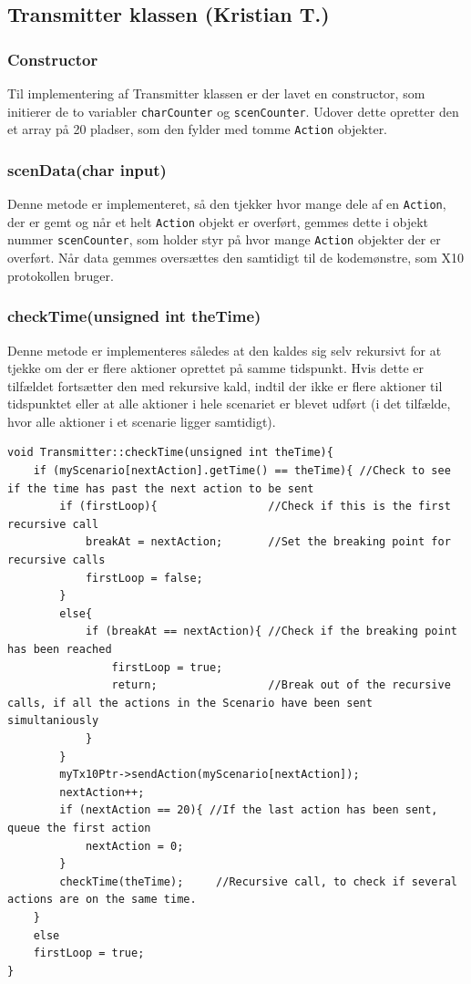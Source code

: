 \subsection{Transmitter klassen (Kristian T.)}

\subsubsection{Constructor}
Til implementering af Transmitter klassen er der lavet en constructor, som initierer de to variabler \texttt{charCounter} og \texttt{scenCounter}. Udover dette opretter den et array på 20 pladser, som den fylder med tomme \texttt{Action} objekter.

\subsubsection{scenData(char input)}
Denne metode er implementeret, så den tjekker hvor mange dele af en \texttt{Action}, der er gemt og når et helt \texttt{Action} objekt er overført, gemmes dette i objekt nummer \texttt{scenCounter}, som holder styr på hvor mange \texttt{Action} objekter der er overført. Når data gemmes oversættes den samtidigt til de kodemønstre, som X10 protokollen bruger.

\subsubsection{checkTime(unsigned int theTime)}
Denne metode er implementeres således at den kaldes sig selv rekursivt for at tjekke om der er flere aktioner oprettet på samme tidspunkt. Hvis dette er tilfældet fortsætter den med rekursive kald, indtil der ikke er flere aktioner til tidspunktet eller at alle aktioner i hele scenariet er blevet udført (i det tilfælde, hvor alle aktioner i et scenarie ligger samtidigt).

\begin{lstlisting}
void Transmitter::checkTime(unsigned int theTime){
	if (myScenario[nextAction].getTime() == theTime){ //Check to see if the time has past the next action to be sent
		if (firstLoop){					//Check if this is the first recursive call
			breakAt = nextAction;		//Set the breaking point for recursive calls
			firstLoop = false;
		}
		else{
			if (breakAt == nextAction){	//Check if the breaking point has been reached
				firstLoop = true;
				return;					//Break out of the recursive calls, if all the actions in the Scenario have been sent simultaniously
			}
		}
		myTx10Ptr->sendAction(myScenario[nextAction]);
		nextAction++;
		if (nextAction == 20){ //If the last action has been sent, queue the first action
			nextAction = 0;
		}
		checkTime(theTime);		//Recursive call, to check if several actions are on the same time.
	}
	else
	firstLoop = true;
}
\end{lstlisting}


